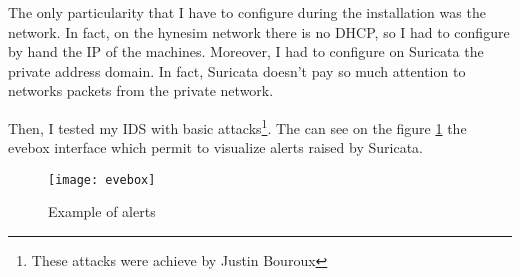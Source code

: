 The only particularity that I have to configure during the installation was the network. In fact, on the hynesim
network there is no DHCP, so I had to configure by hand the IP of the machines. Moreover, I had to configure on
Suricata the private address domain. In fact, Suricata doesn't pay so much attention to networks packets from the
private network.

Then, I tested my IDS with basic attacks\footnote{These attacks were achieve by Justin Bouroux}. The can see on the
figure \ref{fig:evebox} the evebox interface which permit to visualize alerts raised by Suricata.

\begin{figure}[h]
  \centering
  \texttt{[image: evebox]}
  \caption{Example of alerts}
  \label{fig:evebox}
\end{figure}


